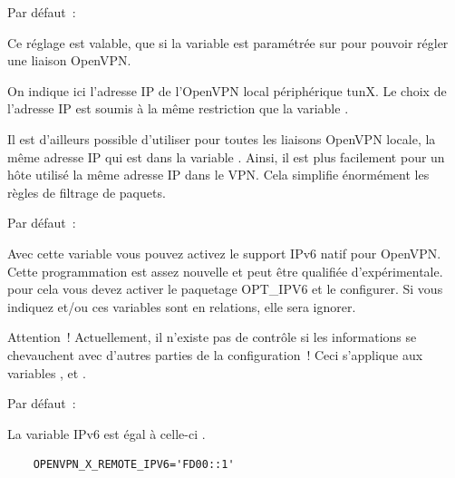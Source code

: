 \begin{description}

  Par défaut~: 

  Ce réglage est valable, que si la variable 
  est paramétrée sur  pour pouvoir régler une liaison OpenVPN.

  On indique ici l'adresse IP de l'OpenVPN local périphérique tunX. Le choix de
  l'adresse IP est soumis à la même restriction que la variable
  .

  Il est d'ailleurs possible d'utiliser pour toutes les liaisons OpenVPN locale,
  la même adresse IP qui est dans la variable .
  Ainsi, il est plus facilement pour un hôte utilisé la même adresse IP dans le
  VPN. Cela simplifie énormément les règles de filtrage de paquets.


  Par défaut~: 

  Avec cette variable vous pouvez activez le support IPv6 natif pour OpenVPN.
  Cette programmation est assez nouvelle et peut être qualifiée d'expérimentale.
  pour cela vous devez activer le paquetage OPT\_IPV6 et le configurer. Si vous
  indiquez  et/ou  ces variables
  sont en relations, elle sera ignorer.

  Attention~! Actuellement, il n'existe pas de contrôle si les informations se
  chevauchent avec d'autres parties de la configuration~! Ceci s'applique aux
  variables , 
  et .


  Par défaut~: 

  La variable IPv6 est égal à celle-ci .

  \begin{example}
  \begin{verbatim}
    OPENVPN_X_REMOTE_IPV6='FD00::1'
  \end{verbatim}
  \end{example}


\end{description}

